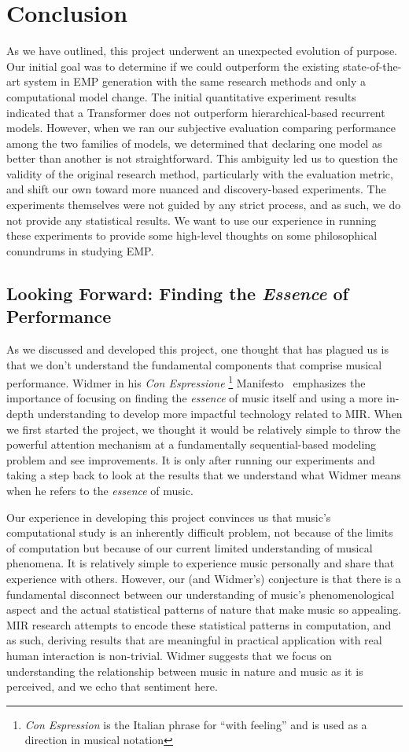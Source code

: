 \chapter{Conclusion} \label{ch:ch8}
As we have outlined, this project underwent an unexpected evolution of purpose. Our initial goal was to determine if we could outperform the existing state-of-the-art system in EMP generation with the same research methods and only a computational model change. The initial quantitative experiment results indicated that a Transformer does not outperform hierarchical-based recurrent models. However, when we ran our subjective evaluation comparing performance among the two families of models, we determined that declaring one model as better than another is not straightforward. This ambiguity led us to question the validity of the original research method, particularly with the evaluation metric, and shift our own toward more nuanced and discovery-based experiments. The experiments themselves were not guided by any strict process, and as such, we do not provide any statistical results. We want to use our experience in running these experiments to provide some high-level thoughts on some philosophical conundrums in studying EMP. 

\section{Looking Forward: Finding the \emph{Essence} of Performance}
As we discussed and developed this project, one thought that has plagued us is that we don't understand the fundamental components that comprise musical performance. Widmer in his \emph{Con Espressione}%
\footnote{\emph{Con Espression} is the Italian phrase for ``with feeling'' and is used as a direction in musical notation}%
Manifesto~\cite{widmer2016getting} emphasizes the importance of focusing on finding the \emph{essence} of music itself and using a more in-depth understanding to develop more impactful technology related to MIR. When we first started the project, we thought it would be relatively simple to throw the powerful attention mechanism at a fundamentally sequential-based modeling problem and see improvements. It is only after running our experiments and taking a step back to look at the results that we understand what Widmer means when he refers to the \emph{essence} of music. 

Our experience in developing this project convinces us that music's computational study is an inherently difficult problem, not because of the limits of computation but because of our current limited understanding of musical phenomena. It is relatively simple to experience music personally and share that experience with others. However, our (and Widmer's) conjecture is that there is a fundamental disconnect between our understanding of music's phenomenological aspect and the actual statistical patterns of nature that make music so appealing. MIR research attempts to encode these statistical patterns in computation, and as such, deriving results that are meaningful in practical application with real human interaction is non-trivial. Widmer suggests that we focus on understanding the relationship between music in nature and music as it is perceived, and we echo that sentiment here. 


